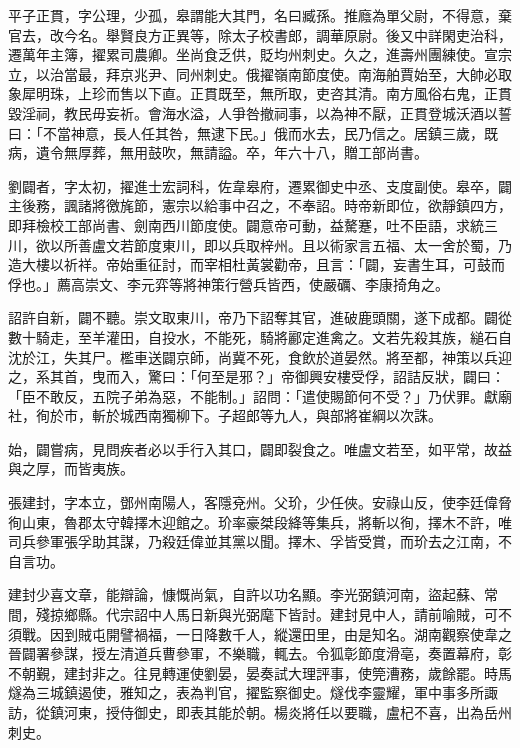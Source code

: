 \begin{pinyinscope}
 平子正貫，字公理，少孤，皋謂能大其門，名曰臧孫。推廕為單父尉，不得意，棄官去，改今名。舉賢良方正異等，除太子校書郎，調華原尉。後又中詳閑吏治科，遷萬年主簿，擢累司農卿。坐尚食乏供，貶均州刺史。久之，進壽州團練使。宣宗立，以治當最，拜京兆尹、同州刺史。俄擢嶺南節度使。南海舶賈始至，大帥必取象犀明珠，上珍而售以下直。正貫既至，無所取，吏咨其清。南方風俗右鬼，正貫毀淫祠，教民毋妄祈。會海水溢，人爭咎撤祠事，以為神不厭，正貫登城沃酒以誓曰：「不當神意，長人任其咎，無逮下民。」俄而水去，民乃信之。居鎮三歲，既病，遺令無厚葬，無用鼓吹，無請謚。卒，年六十八，贈工部尚書。



 劉闢者，字太初，擢進士宏詞科，佐韋皋府，遷累御史中丞、支度副使。皋卒，闢主後務，諷諸將徼旄節，憲宗以給事中召之，不奉詔。時帝新即位，欲靜鎮四方，即拜檢校工部尚書、劍南西川節度使。闢意帝可動，益驁蹇，吐不臣語，求統三川，欲以所善盧文若節度東川，即以兵取梓州。且以術家言五福、太一舍於蜀，乃造大樓以祈祥。帝始重征討，而宰相杜黃裳勸帝，且言：「闢，妄書生耳，可鼓而俘也。」薦高崇文、李元弈等將神策行營兵皆西，使嚴礪、李康掎角之。



 詔許自新，闢不聽。崇文取東川，帝乃下詔奪其官，進破鹿頭關，遂下成都。闢從數十騎走，至羊灌田，自投水，不能死，騎將酈定進禽之。文若先殺其族，縋石自沈於江，失其尸。檻車送闢京師，尚冀不死，食飲於道晏然。將至都，神策以兵迎之，系其首，曳而入，驚曰：「何至是邪？」帝御興安樓受俘，詔詰反狀，闢曰：「臣不敢反，五院子弟為惡，不能制。」詔問：「遣使賜節何不受？」乃伏罪。獻廟社，徇於市，斬於城西南獨柳下。子超郎等九人，與部將崔綱以次誅。



 始，闢嘗病，見問疾者必以手行入其口，闢即裂食之。唯盧文若至，如平常，故益與之厚，而皆夷族。



 張建封，字本立，鄧州南陽人，客隱兗州。父玠，少任俠。安祿山反，使李廷偉脅徇山東，魯郡太守韓擇木迎館之。玠率豪桀段絳等集兵，將斬以徇，擇木不許，唯司兵參軍張孚助其謀，乃殺廷偉並其黨以聞。擇木、孚皆受賞，而玠去之江南，不自言功。



 建封少喜文章，能辯論，慷慨尚氣，自許以功名顯。李光弼鎮河南，盜起蘇、常間，殘掠鄉縣。代宗詔中人馬日新與光弼麾下皆討。建封見中人，請前喻賊，可不須戰。因到賊屯開譬禍福，一日降數千人，縱還田里，由是知名。湖南觀察使韋之晉闢署參謀，授左清道兵曹參軍，不樂職，輒去。令狐彰節度滑亳，奏置幕府，彰不朝覲，建封非之。往見轉運使劉晏，晏奏試大理評事，使筦漕務，歲餘罷。時馬燧為三城鎮遏使，雅知之，表為判官，擢監察御史。燧伐李靈耀，軍中事多所諏訪，從鎮河東，授侍御史，即表其能於朝。楊炎將任以要職，盧杞不喜，出為岳州刺史。




\end{pinyinscope}
